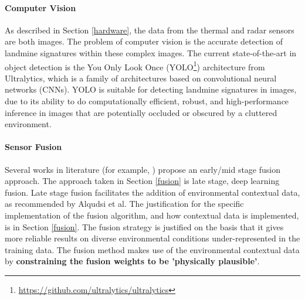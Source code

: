     \paragraph{Computer Vision} 

        As described in Section \ref{hardware}, the data from the thermal and radar sensors are both images. The problem of computer vision is the accurate detection of landmine signatures within these complex images. The current state-of-the-art in object detection is the You Only Look Once (YOLO\footnote{\url{https://github.com/ultralytics/ultralytics}}) architecture from Ultralytics, which is a family of architectures based on convolutional neural networks (CNNs). YOLO is suitable for detecting landmine signatures in images, due to its ability to do computationally efficient, robust, and high-performance inference in images that are potentially occluded or obscured by a cluttered environment.
    
    \paragraph{Sensor Fusion} 
    
        \noindent Several works in literature (for example, \cite{qui2023fusion}) propose an early/mid stage fusion approach. The approach taken in Section \ref{fusion} is late stage, deep learning fusion. Late stage fusion facilitates the addition of environmental contextual data, as recommended by Alqudsi et al. The justification for the specific implementation of the fusion algorithm, and how contextual data is implemented, is in Section \ref{fusion}. The fusion strategy is justified on the basis that it gives more reliable results on diverse environmental conditions under-represented in the training data. The fusion method makes use of the environmental contextual data by \textbf{constraining the fusion weights to be 'physically plausible'}.
    


